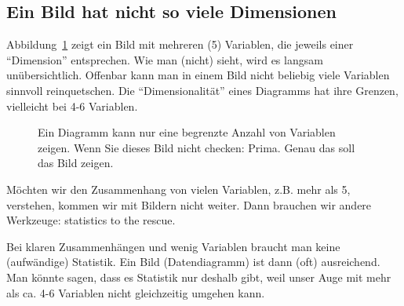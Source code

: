 \documentclass[
  letterpaper,
]{scrbook}
\theoremstyle{definition}
\theoremstyle{definition}
\theoremstyle{definition}
\theoremstyle{remark}
\begin{document}
\subsection{Ein Bild hat nicht so viele
Dimensionen}\label{ein-bild-hat-nicht-so-viele-dimensionen}

Abbildung~\ref{fig-many-dims} zeigt ein Bild mit mehreren (5) Variablen,
die jeweils einer ``Dimension'' entsprechen. Wie man (nicht) sieht, wird
es langsam unübersichtlich. Offenbar kann man in einem Bild nicht
beliebig viele Variablen sinnvoll reinquetschen. Die ``Dimensionalität''
eines Diagramms hat ihre Grenzen, vielleicht bei 4-6 Variablen.

\begin{figure}


\caption{\label{fig-many-dims}Ein Diagramm kann nur eine begrenzte
Anzahl von Variablen zeigen. Wenn Sie dieses Bild nicht checken: Prima.
Genau das soll das Bild zeigen.}

\end{figure}%

Möchten wir den Zusammenhang von vielen Variablen, z.B. mehr als 5,
verstehen, kommen wir mit Bildern nicht weiter. Dann brauchen wir andere
Werkzeuge: statistics to the rescue.

\begin{tcolorbox}[enhanced jigsaw, left=2mm, toptitle=1mm, toprule=.15mm, rightrule=.15mm, leftrule=.75mm, breakable, colbacktitle=quarto-callout-note-color!10!white, colback=white, coltitle=black, bottomtitle=1mm, opacityback=0, title=\textcolor{quarto-callout-note-color}{\faInfo}\hspace{0.5em}{Hinweis}, colframe=quarto-callout-note-color-frame, arc=.35mm, opacitybacktitle=0.6, bottomrule=.15mm, titlerule=0mm]

Bei klaren Zusammenhängen und wenig Variablen braucht man keine
(aufwändige) Statistik. Ein Bild (Datendiagramm) ist dann (oft)
ausreichend. Man könnte sagen, dass es Statistik nur deshalb gibt, weil
unser Auge mit mehr als ca. 4-6 Variablen nicht gleichzeitig umgehen
kann.

\end{tcolorbox}
\end{document}
